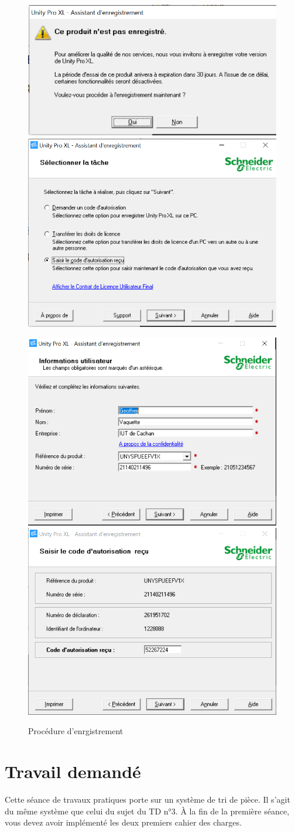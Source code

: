 \documentclass[11pt]{article}
\begin{document}
\begin{figure}[h!t]
	\includegraphics[width=.45\textwidth]{images/installationUnity/enregistrement}%
	\hfill \includegraphics[width=.45\textwidth]{images/installationUnity/enregistrement-2}

\vspace{1cm}
	\includegraphics[width=.45\textwidth]{images/installationUnity/enregistrement-3}%
	\hfill \includegraphics[width=.45\textwidth]{images/installationUnity/enregistrement-4}
	\caption{Procédure d'enrgistrement}
	\label{fig:enregistrement}
\end{figure}

\pagebreak
\section{Travail demandé}
Cette séance de travaux pratiques porte sur un système de tri de pièce. Il s'agit du même système que celui du sujet du TD n°3.
À la fin de la première séance, vous devez avoir implémenté les deux premiers cahier des charges.
\end{document}
